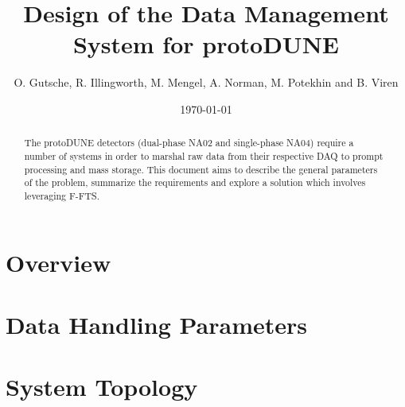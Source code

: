 \documentclass[pdftex,12pt,letter]{article}
\title{Design of the Data Management System for protoDUNE}
\date{\today}
\author{O. Gutsche, R. Illingworth, M. Mengel, A. Norman, M. Potekhin and B. Viren}
\begin{document}
\maketitle

\begin{abstract}
The protoDUNE detectors (dual-phase NA02 and single-phase NA04)
require a number of systems in order to marshal raw data from
their respective DAQ to prompt processing and mass storage.  This
document aims to  describe the general parameters of the problem, summarize the requirements
and explore a solution which involves leveraging F-FTS.
\end{abstract}

\tableofcontents

\pagebreak

\section{Overview}



\section{Data Handling Parameters}


\section{System Topology}

\end{document}
